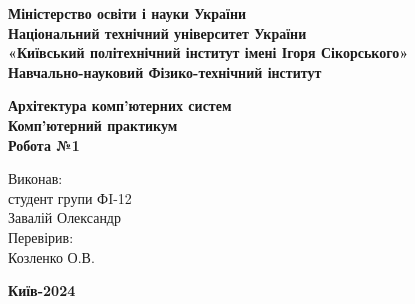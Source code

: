\documentclass[a4paper,12pt]{article}
\begin{document}
    \pagestyle{fancy}
    \fancyhead{}
    \begin{center}
        \large{\textbf{Міністерство освіти і науки України\\
                Національний технічний університет України\\
                «Київський політехнічний інститут імені Ігоря Сікорського»\\
                Навчально-науковий Фізико-технічний інститут}}\\
        \hfill \break \hfill \break \hfill\break \hfill \break \hfill \break \hfill \break \hfill \break
        \hfill \break \hfill \break \hfill \break
        \begin{center}
            \normalsize{\textbf{Архітектура комп'ютерних систем\\
            Комп’ютерний практикум\\
            Робота №1}}
        \end{center}
    \end{center}
    \hfill \break \hfill \break \hfill \break \hfill \break \hfill \break \hfill \break \hfill \break
    \hfill \break \hfill \break \hfill \break \hfill \break 
    \begin{flushright}
        \large{ \hspace{35pt} Виконав:\\
            студент групи ФI-12\\
            Завалій Олександр\\} 
        \large{ \hspace{35pt} Перевірив:\\
        Козленко О.В.} 
    \end{flushright}
    \hfill \break \hfill \break \hfill \break \hfill \break \hfill \break \hfill \break \hfill \break
    \hfill \break
    \begin{center} \textbf{Київ-2024} \end{center}
    \thispagestyle{empty}
\end{document}
